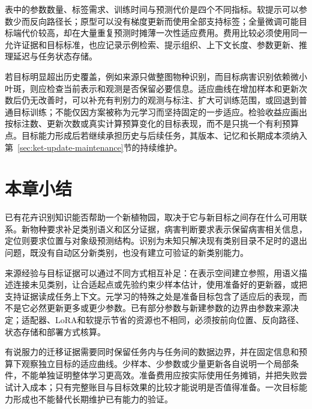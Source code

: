 表中的参数数量、标签需求、训练时间与预测代价是四个不同指标。软提示可以参数少而反向路径长；原型可以没有梯度更新而使用全部支持标签；全量微调可能目标端代价较高，却在大量重复预测时摊薄一次性适应费用。费用比较必须使用同一允许证据和目标标准，也应记录示例检索、提示组织、上下文长度、参数更新、推理延迟与任务状态存储。

若目标明显超出历史覆盖，例如来源只做整图物种识别，而目标病害识别依赖微小叶斑，则应检查当前表示和观测是否保留必要信息。适应曲线在增加样本和更新次数后仍无改善时，可以补充有判别力的观测与标注、扩大可训练范围，或回退到普通目标训练；不能仅因方案被称为元学习而坚持固定的一步适应。检验收益应画出按标注数、更新次数或真实计算预算变化的目标表现，而不是只挑一个有利预算点。目标能力形成后若继续承担历史与后续任务，其版本、记忆和长期成本须纳入第~\ref{sec:ket-update-maintenance}节的持续维护。

\section{本章小结}
\label{sec:ket-transfer-summary}

已有花卉识别知识能否帮助一个新植物园，取决于它与新目标之间存在什么可用联系。新物种要求补足类别语义和区分证据，病害判断要求表示保留病害相关信息，定位则要求位置与对象级预测结构。识别为未知只解决现有类别目录不足时的退出问题，既没有自动区分新类别，也没有建立可验证的新类别能力。

来源经验与目标证据可以通过不同方式相互补足：在表示空间建立参照，用语义描述连接未见类别，让合适起点或先验约束少样本估计，使用准备好的更新器，或把支持证据读成任务上下文。元学习的特殊之处是准备目标包含了适应后的表现，而不是它必然更新更多或更少参数。已有部分参数与新建参数的边界由参数来源决定；适配器、LoRA和软提示节省的资源也不相同，必须按前向位置、反向路径、状态存储和部署方式核算。

有说服力的迁移证据需要同时保留任务内与任务间的数据边界，并在固定信息和预算下观察独立目标的适应曲线。少样本、少参数或少量更新各自说明一个局部条件，不能单独证明整体学习更高效。准备费用应按实际使用任务摊销，并把失败尝试计入成本；只有完整账目与目标效果的比较才能说明是否值得准备。一次目标能力形成也不能替代长期维护已有能力的验证。
